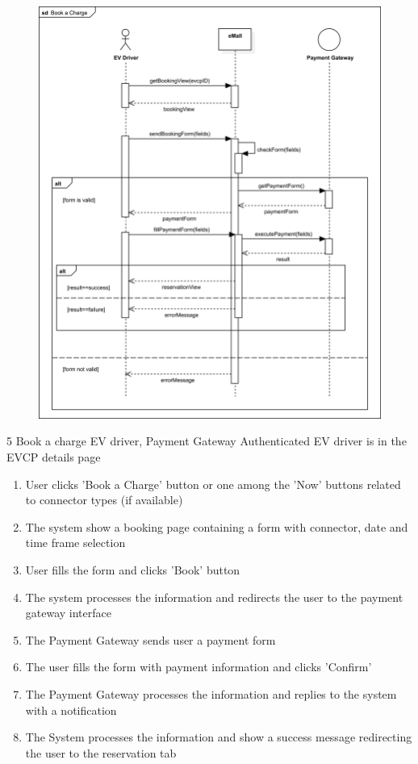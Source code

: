 \usecase
{
    \begin{figure}[H]
        \centering
        \includegraphics[scale=0.9]{src/sequence_diagram/bookCharge.png}
    \end{figure}
}
{5}
{Book a charge}
{EV driver, Payment Gateway}
{Authenticated EV driver is in the EVCP details page}
{
    \begin{enumerate}
        \item User clicks 'Book a Charge' button or one among the 'Now' buttons related to connector types (if available)
        \item The system show a booking page containing a form with connector, date and time frame selection
        \item User fills the form and clicks 'Book' button
        \item The system processes the information and redirects the user to the payment gateway interface
        \item The Payment Gateway sends user a payment form
        \item The user fills the form with payment information and clicks 'Confirm'
        \item The Payment Gateway processes the information and replies to the system with a notification
        \item The System processes the information and show a success message redirecting the user to the reservation tab
    \end{enumerate}
}
